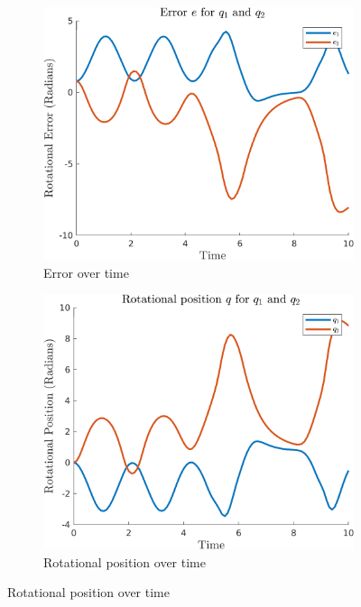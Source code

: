 \documentclass{article}
\begin{document}
\begin{figure}[H]
    \centering
    \begin{subfigure}{0.325\textwidth}
        \centering
        \includegraphics[width = \textwidth]{figures/error-d3.png}
        \caption{Error over time}
    \end{subfigure}
    \begin{subfigure}{0.325\textwidth}
        \centering
        \includegraphics[width = \textwidth]{figures/rotational-position-d3.png}
        \caption{Rotational position over time}
    \end{subfigure}

\end{figure}
\end{document}
